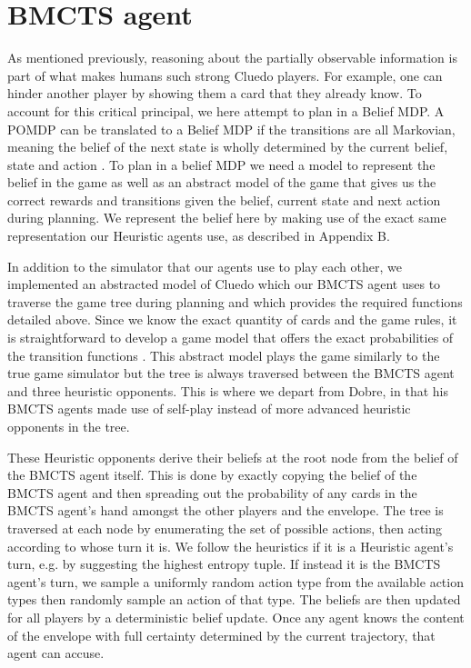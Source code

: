 \documentclass[msc, ai, logo, twoside, notimes, parskip, leftchapter, normalheadings]{infthesis}
\begin{document}
\section{BMCTS agent}
As mentioned previously, reasoning about the partially observable information is part of what makes humans such strong Cluedo players. For example, one can hinder another player by showing them a card that they already know. To account for this critical principal, we here attempt to plan in a Belief MDP. A POMDP can be translated to a Belief MDP if the transitions are all Markovian, meaning the belief of the next state is wholly determined by the current belief, state and action \citep{Mihai}. To plan in a belief MDP we need a model to represent the belief in the game as well as an abstract model of the game that gives us the correct rewards and transitions given the belief, current state and next action during planning. We represent the belief here by making use of the exact same representation our Heuristic agents use, as described in Appendix B. 

In addition to the simulator that our agents use to play each other, we implemented an abstracted model of Cluedo which our BMCTS agent uses to traverse the game tree during planning and which provides the required functions detailed above. Since we know the exact quantity of cards and the game rules, it is straightforward to develop a game model that offers the exact probabilities of the transition functions \citep{Mihai}. This abstract model plays the game similarly to the true game simulator but the tree is always traversed between the BMCTS agent and three heuristic opponents. This is where we depart from Dobre, in that his BMCTS agents made use of self-play instead of more advanced heuristic opponents in the tree. 

These Heuristic opponents derive their beliefs at the root node from the belief of the BMCTS agent itself. This is done by exactly copying the belief of the BMCTS agent and then spreading out the probability of any cards in the BMCTS agent's hand amongst the other players and the envelope. The tree is traversed at each node by enumerating the set of possible actions, then acting according to whose turn it is. We follow the heuristics if it is a Heuristic agent's turn, e.g. by suggesting the highest entropy tuple. If instead it is the BMCTS agent's turn, we sample a uniformly random action type from the available action types then randomly sample an action of that type. The beliefs are then updated for all players by a deterministic belief update. Once any agent knows the content of the envelope with full certainty determined by the current trajectory, that agent can accuse. 
\end{document}
